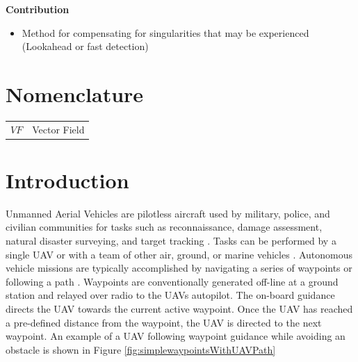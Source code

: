 \documentclass[conf]{new-aiaa}
\begin{document}
\textbf{Contribution}
\begin{itemize}
	\item Method for compensating for singularities that may be experienced (Lookahead or fast detection)
\end{itemize}




\section{Nomenclature}

{\renewcommand\arraystretch{1.0}
\noindent\begin{longtable*}{@{}l @{\quad=\quad} l@{}}
$VF$  & Vector Field \\
\end{longtable*}}

\section{Introduction}
Unmanned Aerial Vehicles are pilotless aircraft used by military, police, and civilian communities for tasks such as reconnaissance, damage assessment, natural disaster surveying, and target tracking \cite{ariyur_autonomous_2008,teuliere_chasing_2011}. Tasks can be performed by a single UAV or with a team of other air, ground, or marine vehicles \cite{oh_coordinated_2013,hyondong_oh_coordinated_2015,ulun_coordinated_2013}. Autonomous vehicle missions are typically accomplished by navigating a series of waypoints \cite{ariyur_autonomous_2008} or following a path \cite{oliveira_moving_2016}. Waypoints are conventionally generated off-line at a ground station and relayed over radio to the UAVs autopilot. The on-board guidance directs the UAV towards the current active waypoint. Once the UAV has reached a pre-defined distance from the waypoint, the UAV is directed to the next waypoint. An example of a UAV following waypoint guidance while avoiding an obstacle is shown in Figure \ref{fig:simplewaypointsWithUAVPath}
\end{document}
